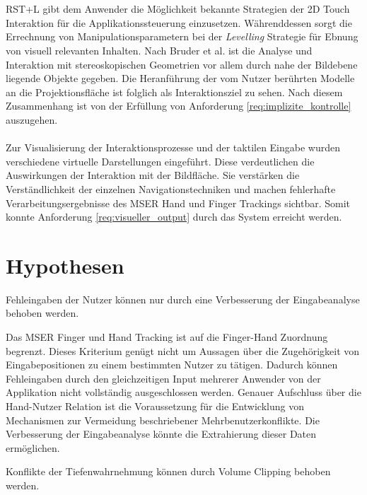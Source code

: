 \\\\
RST+L gibt dem Anwender die Möglichkeit bekannte Strategien der 2D Touch Interaktion für die Applikationssteuerung einzusetzen. Währenddessen sorgt die Errechnung von Manipulationsparametern bei der \emph{Levelling} Strategie für Ebnung von visuell relevanten Inhalten. Nach Bruder et al. ist die Analyse und Interaktion mit stereoskopischen Geometrien vor allem durch nahe der Bildebene liegende Objekte gegeben. Die Heranführung der vom Nutzer berührten Modelle an die Projektionsfläche ist folglich als Interaktionsziel zu sehen. Nach diesem Zusammenhang ist von der Erfüllung von Anforderung \ref{req:implizite_kontrolle} auszugehen.
\\\\
Zur Visualisierung der Interaktionsprozesse und der taktilen Eingabe wurden verschiedene virtuelle Darstellungen eingeführt. Diese verdeutlichen die Auswirkungen der Interaktion mit der Bildfläche. Sie  verstärken die Verständlichkeit der einzelnen Navigationstechniken und machen fehlerhafte Verarbeitungsergebnisse des MSER Hand und Finger Trackings sichtbar. Somit konnte Anforderung \ref{req:visueller_output} durch das System erreicht werden.


\section{Hypothesen}
\label{sec:hypothesen}

	\begin{hypothese}
	\label{hyp:fehleingaben}
		Fehleingaben der Nutzer können nur durch eine Verbesserung der Eingabeanalyse behoben werden.
	\end{hypothese}

Das MSER Finger und Hand Tracking ist auf die Finger-Hand Zuordnung begrenzt. Dieses Kriterium genügt nicht um Aussagen über die Zugehörigkeit von Eingabepositionen zu einem bestimmten Nutzer zu tätigen. Dadurch können Fehleingaben durch den gleichzeitigen Input mehrerer Anwender von der Applikation nicht vollständig ausgeschlossen werden. Genauer Aufschluss über die Hand-Nutzer Relation ist die Voraussetzung für die Entwicklung von Mechanismen zur Vermeidung beschriebener Mehrbenutzerkonflikte. Die Verbesserung der Eingabeanalyse könnte die Extrahierung dieser Daten ermöglichen.

	\begin{hypothese}
		\label{hyp:konflikte}
		Konflikte der Tiefenwahrnehmung können durch Volume Clipping behoben werden.
	\end{hypothese}
	
